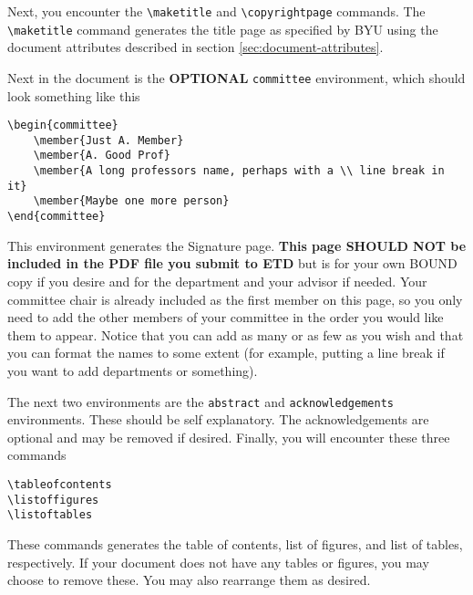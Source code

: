 \documentclass[12pt]{thesis}
\begin{document}
Next, you encounter the \verb=\maketitle= and \verb=\copyrightpage= commands. The \verb=\maketitle= command generates the title page as specified by BYU using the document attributes described in section \ref{sec:document-attributes}. 

Next in the document is the \textbf{OPTIONAL} \texttt{committee} environment, which should look something like this
\begin{verbatim}
\begin{committee}
	\member{Just A. Member}
	\member{A. Good Prof}
	\member{A long professors name, perhaps with a \\ line break in it}
	\member{Maybe one more person}
\end{committee}	
\end{verbatim}
This environment generates the Signature page.  \textbf{This page SHOULD NOT be included in the PDF file you submit to ETD} but is for your own BOUND copy if you desire and for the department and your advisor if needed. Your committee chair is already included as the first member on this page, so you only need to add the other members of your committee in the order you would like them to appear. Notice that you can add as many or as few as you wish and that you can format the names to some extent (for example, putting a line break if you want to add departments or something).

The next two environments are the \texttt{abstract} and \texttt{acknowledgements} environments. These should be self explanatory. The acknowledgements are optional and may be removed if desired. Finally, you will encounter these three commands
\begin{verbatim}
\tableofcontents
\listoffigures
\listoftables
\end{verbatim}
These commands generates the table of contents, list of figures, and list of tables, respectively. If your document does not have any tables or figures, you may choose to remove these. You may also rearrange them as desired.
\end{document}
